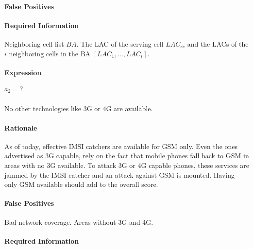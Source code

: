 \documentclass[a4paper,11pt,notitlepage,bigheadings,oneside]{scrartcl}
\begin{document}
\paragraph{False Positives}


\paragraph{Required Information}

Neighboring cell list $BA$. The LAC of the serving cell $LAC_{sc}$ and the LACs
of the $i$ neighboring cells in the BA $[LAC_1,…,LAC_i]$.

\paragraph{Expression}

$a_2 = ?$


\subsubsection{}

No other technologies like 3G or 4G are available.

\paragraph{Rationale}

As of today, effective IMSI catchers are available for GSM only. Even the ones
advertised as 3G capable, rely on the fact that mobile phones fall back to GSM
in areas with no 3G available. To attack 3G or 4G capable phones, these
services are jammed by the IMSI catcher and an attack against GSM is mounted.
Having only GSM available should add to the overall score.

\paragraph{False Positives}

Bad network coverage. Areas without 3G and 4G.

\paragraph{Required Information}
\end{document}
